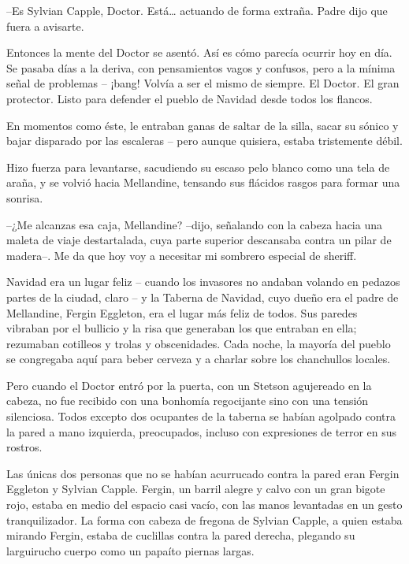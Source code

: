 --Es Sylvian Capple, Doctor. Está… actuando de forma extraña. Padre dijo que fuera a avisarte.

Entonces la mente del Doctor se asentó. Así es cómo parecía ocurrir hoy en día. Se pasaba días a la deriva, con pensamientos vagos y confusos, pero a la mínima señal de problemas – ¡bang! Volvía a ser el mismo de siempre. El Doctor. El gran protector. Listo para defender el pueblo de Navidad desde todos los flancos.

En momentos como éste, le entraban ganas de saltar de la silla, sacar su sónico y bajar disparado por las escaleras – pero aunque quisiera, estaba tristemente débil.

Hizo fuerza para levantarse, sacudiendo su escaso pelo blanco como una tela de araña, y se volvió hacia Mellandine, tensando sus flácidos rasgos para formar una sonrisa.

--¿Me alcanzas esa caja, Mellandine? --dijo, señalando con la cabeza hacia una maleta de viaje destartalada, cuya parte superior descansaba contra un pilar de madera--. Me da que hoy voy a necesitar mi sombrero especial de sheriff.



\mbox{}



\centerline{ \Huge *}



\mbox{}



Navidad era un lugar feliz – cuando los invasores no andaban volando en pedazos partes de la ciudad, claro – y la Taberna de Navidad, cuyo dueño era el padre de Mellandine, Fergin Eggleton, era el lugar más feliz de todos. Sus paredes vibraban por el bullicio y la risa que generaban los que entraban en ella; rezumaban cotilleos y trolas y obscenidades. Cada noche, la mayoría del pueblo se congregaba aquí para beber cerveza y a charlar sobre los chanchullos locales.

Pero cuando el Doctor entró por la puerta, con un Stetson agujereado en la cabeza, no fue recibido con una bonhomía regocijante sino con una tensión silenciosa. Todos excepto dos ocupantes de la taberna se habían agolpado contra la pared a mano izquierda, preocupados, incluso con expresiones de terror en sus rostros.

Las únicas dos personas que no se habían acurrucado contra la pared eran Fergin Eggleton y Sylvian Capple. Fergin, un barril alegre y calvo con un gran bigote rojo, estaba en medio del espacio casi vacío, con las manos levantadas en un gesto tranquilizador. La forma con cabeza de fregona de Sylvian Capple, a quien estaba mirando Fergin, estaba de cuclillas contra la pared derecha, plegando su larguirucho cuerpo como un papaíto piernas largas.

